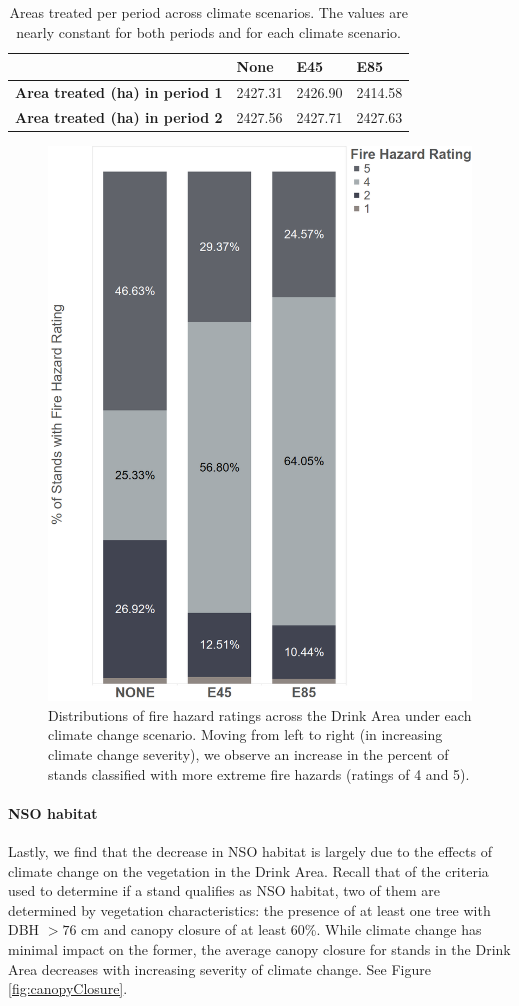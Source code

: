 \begin{table}[]
\centering
\caption[Area treated per period across climate scenarios]{Areas treated per period across climate scenarios. The values are nearly constant for both periods and for each climate scenario.}
\label{tab:treatedAreas}
\begin{tabular}{llll}
                                                                                                           & \textbf{None} & \textbf{E45} & \textbf{E85} \\ \hline
\textbf{Area treated (ha) in period 1} & 2427.31            & 2426.90 & 2414.58          \\
\textbf{Area treated (ha) in period 2}                     & 2427.56         & 2427.71        & 2427.63      
\end{tabular}
\end{table}

\begin{figure}[ht]
\centering
\includegraphics[width=.5\textwidth]{../images/FireHazardRatingsPerClimateScenario}
\caption[Distribution of fire hazard ratings over the Drink Area for each climate change scenario]{Distributions of fire hazard ratings across the Drink Area under each climate change scenario. Moving from left to right (in increasing climate change severity), we observe an increase in the percent of stands classified with more extreme fire hazards (ratings of 4 and 5).}
\label{fig:distOfFireHazards}
\end{figure}

\paragraph{NSO habitat}
Lastly, we find that the decrease in NSO habitat is largely due to the effects of climate change on the vegetation in the Drink Area. Recall that of the criteria used to determine if a stand qualifies as NSO habitat, two of them are determined by vegetation characteristics: the presence of at least one tree with DBH $> 76$ cm and canopy closure of at least 60\%. While climate change has minimal impact on the former, the average canopy closure for stands in the Drink Area decreases with increasing severity of climate change. See Figure \ref{fig:canopyClosure}.

